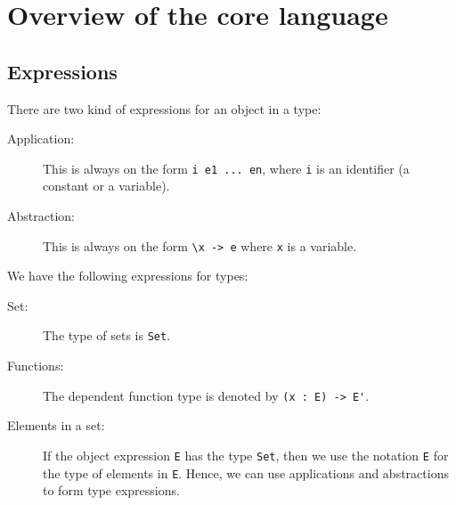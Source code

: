 \section{Overview of the core language}
\subsection{Expressions}
There are two kind of expressions for an object in a type:
\begin{description}
\item[Application:] This is always on the form \verb|i e1 ... en|,
  where \verb|i| is an identifier (a constant or a variable).
\item[Abstraction:] This is always on the form \verb|\x -> e| where
  \verb|x| is a variable.
\end{description}
We have the following expressions for types:
\begin{description}
\item[Set:] The type of sets is \verb|Set|.
\item[Functions:] The dependent function type is denoted by  \verb|(x : E) -> E'|.
\item[Elements in a set:] If the object expression \verb|E| has the
  type \verb|Set|, then we use the notation \verb|E| for the type of
  elements in \verb|E|. Hence, we can use applications and
  abstractions to form type expressions.
\end{description}

